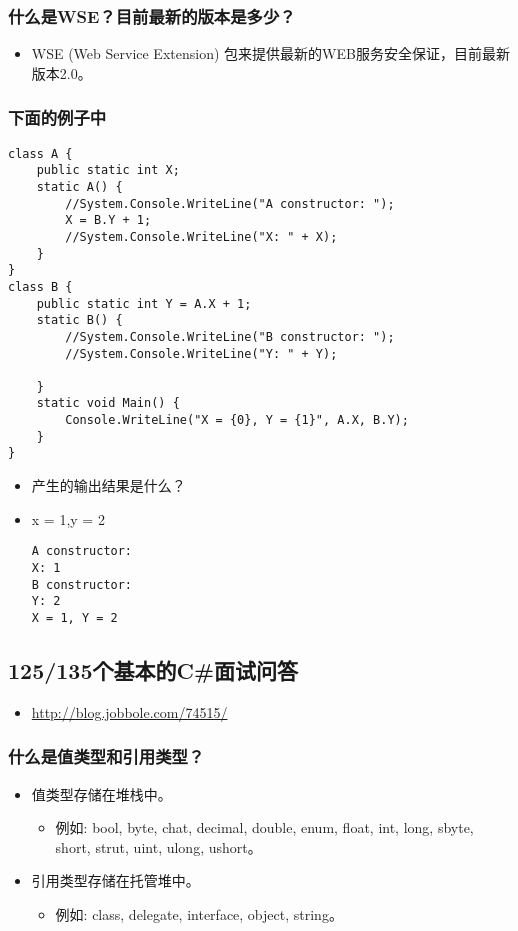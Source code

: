 \documentclass[9pt, b5paper]{article}
\begin{document}
\subsubsection{什么是WSE？目前最新的版本是多少？}
\label{sec-1-1-119}
\begin{itemize}
\item WSE (Web Service Extension) 包来提供最新的WEB服务安全保证，目前最新版本2.0。
\end{itemize}
\subsubsection{下面的例子中}
\label{sec-1-1-120}
\begin{verbatim}
class A {
    public static int X;
    static A() {
        //System.Console.WriteLine("A constructor: ");
        X = B.Y + 1;
        //System.Console.WriteLine("X: " + X);
    }
}
class B {
    public static int Y = A.X + 1;
    static B() {
        //System.Console.WriteLine("B constructor: ");
        //System.Console.WriteLine("Y: " + Y);

    }
    static void Main() {
        Console.WriteLine("X = {0}, Y = {1}", A.X, B.Y);
    }
}
\end{verbatim}
\begin{itemize}
\item 产生的输出结果是什么？
\item x = 1,y = 2

\begin{verbatim}
A constructor: 
X: 1
B constructor: 
Y: 2
X = 1, Y = 2
\end{verbatim}
\end{itemize}

\subsection{125/135个基本的C\#面试问答}
\label{sec-1-2}
\begin{itemize}
\item \url{http://blog.jobbole.com/74515/}
\end{itemize}
\subsubsection{什么是值类型和引用类型？}
\label{sec-1-2-1}
\begin{itemize}
\item 值类型存储在堆栈中。
\begin{itemize}
\item 例如: bool, byte, chat, decimal, double, enum, float, int, long, sbyte, short, strut, uint, ulong, ushort。
\end{itemize}
\item 引用类型存储在托管堆中。
\begin{itemize}
\item 例如: class, delegate, interface, object, string。
\end{itemize}
\end{itemize}
\end{document}
